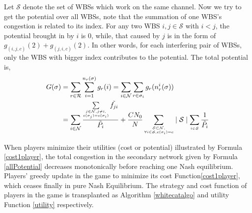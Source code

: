 Let $\mathcal{S}$ denote the set of WBSs which work on the same channel.
Now we try to get the potential over all WBSs, note that the summation of one WBS's congestion is related to its index. For any two WBS $i,j\in \mathcal{S}$ with $i<j$, the potential brought in by $i$ is 0, while, that caused by $j$ is in the form of $g_{(i,j,c)}(2)+g_{(j,i,c)}(2)$. In other words, for each interfering pair of WBSs, only the WBS with bigger index contributes to the potential. The total potential is, 
\begin{equation}
\label{allPotential}
\begin{split}	
G(\sigma) 
& =\sum\limits^{}_{r\in \mathcal{R}} \sum\limits^{n_r(\sigma)}_{i=1} g_r(i)  =\sum\limits_{i\in \mathcal{N}} \sum\limits^{}_{r\in \sigma_i} g_r(n_r^i(\sigma))\\
& = \sum\limits_{i\in \mathcal{N}}\dfrac{\sum\limits_{\tiny\substack{j\in \mathcal{N}, j\ne i,\\ c(\sigma_j)=c(\sigma_i)}}\tilde{f_{ji}}}{\tilde{P_i}} + \dfrac{CN_0}{N}\sum\limits_{\tiny\substack{\mathcal{S}\subset \mathcal{N},\\ \forall i\in \mathcal{S}, c(\sigma_i)=c}} \mid \mathcal{S}\mid   \sum\limits_{\tiny\substack{i\in \mathcal{S}}}\frac{1}{\tilde{P_i}}
\end{split}
\end{equation}



%

When players minimize their utilities (cost or potential) illustrated by Formula \ref{cost1player}, the total congestion in the secondary network given by Formula \ref{allPotential} decreases monotonically before reaching one Nash equilibrium. Players' greedy update in the game to minimize its cost Function\ref{cost1player}, which ceases finally in pure Nash Equilibrium. The strategy and cost function of players in the game is transplanted as Algorithm \ref{whitecatalgo} and utility Function \ref{utility} respectively.

